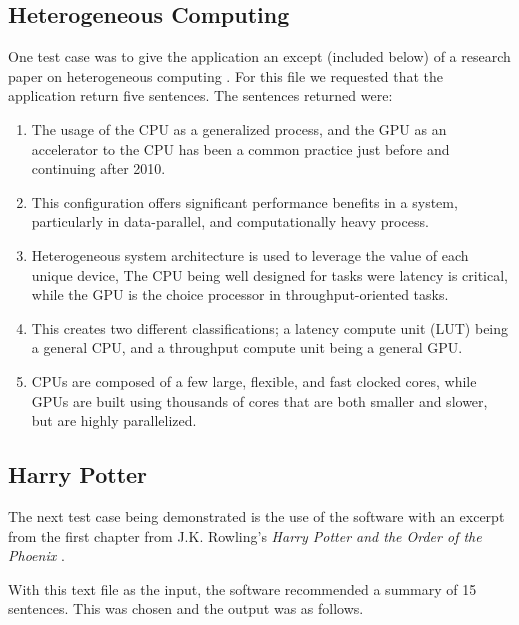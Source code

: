 \subsection{Heterogeneous Computing}
One test case was to give the application an except (included below) of a research paper on heterogeneous computing \cite{noahpaper}.
For this file we requested that the application return five sentences. The sentences returned were:
\begin{enumerate}
	\item The usage of the CPU as a generalized process, and the GPU as an accelerator to the CPU has been a common practice just before and continuing after 2010.
	\item This configuration offers significant performance benefits in a system, particularly in data-parallel, and computationally heavy process.
	\item Heterogeneous system architecture is used to leverage the value of each unique device, The CPU being well designed for tasks were latency is critical, while the GPU is the choice processor in throughput-oriented tasks.
	\item This creates two different classifications; a latency compute unit (LUT) being a general CPU, and a throughput compute unit being a general GPU.
	\item CPUs are composed of a few large, flexible, and fast clocked cores, while GPUs are built using thousands of cores that are both smaller and slower, but are highly parallelized.
\end{enumerate}

\subsection{Harry Potter}
The next test case being demonstrated is the use of the software with an excerpt from the first chapter from J.K. Rowling's {\em Harry Potter and the Order of the Phoenix} \cite{harrypotter}.

With this text file as the input, the software recommended a summary of 15 sentences. This was chosen and the output was as follows.

